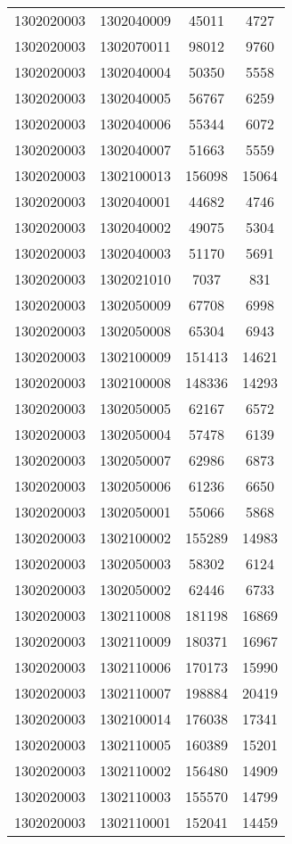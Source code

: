 \begin{longtable}{llcc}
1302020003 & 1302040009 & 45011 & 4727\\
1302020003 & 1302070011 & 98012 & 9760\\
1302020003 & 1302040004 & 50350 & 5558\\
1302020003 & 1302040005 & 56767 & 6259\\
1302020003 & 1302040006 & 55344 & 6072\\
1302020003 & 1302040007 & 51663 & 5559\\
1302020003 & 1302100013 & 156098 & 15064\\
1302020003 & 1302040001 & 44682 & 4746\\
1302020003 & 1302040002 & 49075 & 5304\\
1302020003 & 1302040003 & 51170 & 5691\\
1302020003 & 1302021010 & 7037 & 831\\
1302020003 & 1302050009 & 67708 & 6998\\
1302020003 & 1302050008 & 65304 & 6943\\
1302020003 & 1302100009 & 151413 & 14621\\
1302020003 & 1302100008 & 148336 & 14293\\
1302020003 & 1302050005 & 62167 & 6572\\
1302020003 & 1302050004 & 57478 & 6139\\
1302020003 & 1302050007 & 62986 & 6873\\
1302020003 & 1302050006 & 61236 & 6650\\
1302020003 & 1302050001 & 55066 & 5868\\
1302020003 & 1302100002 & 155289 & 14983\\
1302020003 & 1302050003 & 58302 & 6124\\
1302020003 & 1302050002 & 62446 & 6733\\
1302020003 & 1302110008 & 181198 & 16869\\
1302020003 & 1302110009 & 180371 & 16967\\
1302020003 & 1302110006 & 170173 & 15990\\
1302020003 & 1302110007 & 198884 & 20419\\
1302020003 & 1302100014 & 176038 & 17341\\
1302020003 & 1302110005 & 160389 & 15201\\
1302020003 & 1302110002 & 156480 & 14909\\
1302020003 & 1302110003 & 155570 & 14799\\
1302020003 & 1302110001 & 152041 & 14459\\

\end{longtable}

